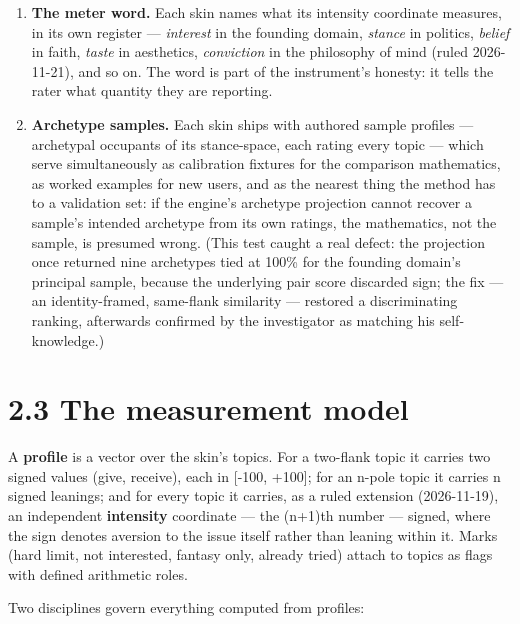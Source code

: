 \begin{enumerate}
  covering both, never one of the joined terms. Names are audited
  against this rule in batches; violations are renamed.
\item
  \textbf{The meter word.} Each skin names what its intensity coordinate
  measures, in its own register --- \emph{interest} in the founding
  domain, \emph{stance} in politics, \emph{belief} in faith,
  \emph{taste} in aesthetics, \emph{conviction} in the philosophy of
  mind (ruled 2026-11-21), and so on. The word is part of the
  instrument's honesty: it tells the rater what quantity they are
  reporting.
\item
  \textbf{Archetype samples.} Each skin ships with authored sample
  profiles --- archetypal occupants of its stance-space, each rating
  every topic --- which serve simultaneously as calibration fixtures for
  the comparison mathematics, as worked examples for new users, and as
  the nearest thing the method has to a validation set: if the engine's
  archetype projection cannot recover a sample's intended archetype from
  its own ratings, the mathematics, not the sample, is presumed wrong.
  (This test caught a real defect: the projection once returned nine
  archetypes tied at 100\% for the founding domain's principal sample,
  because the underlying pair score discarded sign; the fix --- an
  identity-framed, same-flank similarity --- restored a discriminating
  ranking, afterwards confirmed by the investigator as matching his
  self-knowledge.)
\end{enumerate}

\section{2.3 The measurement model}\label{the-measurement-model}

A \textbf{profile} is a vector over the skin's topics. For a two-flank
topic it carries two signed values (give, receive), each in {[}-100,
+100{]}; for an n-pole topic it carries n signed leanings; and for every
topic it carries, as a ruled extension (2026-11-19), an independent
\textbf{intensity} coordinate --- the (n+1)th number --- signed, where
the sign denotes aversion to the issue itself rather than leaning within
it. Marks (hard limit, not interested, fantasy only, already tried)
attach to topics as flags with defined arithmetic roles.

Two disciplines govern everything computed from profiles:

